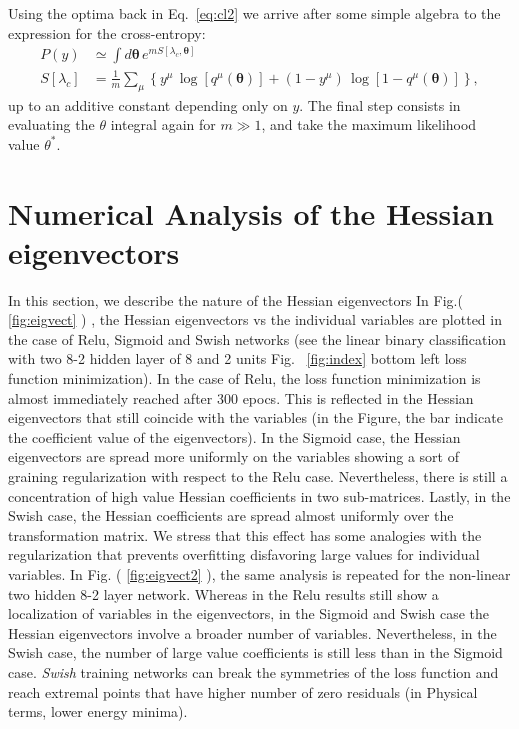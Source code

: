 \documentclass{article}
\begin{document}
%
Using the optima back in Eq.~\eqref{eq:cl2} we arrive after some simple algebra to the expression for the cross-entropy:
%
\begin{align} \label{eq:cl3}
P(y) &\simeq \int d\boldsymbol{\theta} \, e^{m S[\lambda_c, \boldsymbol{\theta}]} \\ \nonumber
S[\lambda_c] &= \frac{1}{m} \sum_{\mu} \left\{ y^{\mu} \, \log [ q^{\mu}( \boldsymbol{\theta} ) ] + (1-y^{\mu}) \, \log [1-q^{\mu}( \boldsymbol{\theta}) ] \right\},
\end{align}
%
up to an additive constant depending only on $y$. The final step consists in evaluating the $\theta$ integral again for $m \gg 1$, and take the maximum likelihood value $\theta^*$.

\section{Numerical Analysis of the Hessian eigenvectors}
In this section, we describe the nature of the Hessian eigenvectors
In Fig.( \ref{fig:eigvect} ) , the Hessian eigenvectors vs the individual variables are plotted in the case of Relu, Sigmoid and Swish networks (see the linear binary classification with two 8-2 hidden layer of 8 and 2 units Fig. ~\eqref{fig:index} bottom left loss function minimization). In the case of Relu, the loss function minimization is almost immediately reached after 300 epocs. This is reflected in the Hessian eigenvectors that still coincide with the variables (in the Figure, the bar indicate the coefficient value of the eigenvectors). In the Sigmoid case, the Hessian eigenvectors are spread more uniformly on the variables showing a sort of graining regularization with respect to the Relu case. Nevertheless, there is still a concentration of high value Hessian coefficients in two sub-matrices. Lastly, in the Swish case, the Hessian coefficients are spread almost uniformly over the transformation matrix. We stress that this effect has some analogies with the regularization that prevents overfitting disfavoring large values for individual variables.
In Fig. ( \ref{fig:eigvect2} ), the same analysis is repeated for the non-linear two hidden 8-2 layer network. Whereas in the Relu results still show a localization of variables in the eigenvectors, in the Sigmoid and Swish case the Hessian eigenvectors involve a broader number of variables. Nevertheless, in the Swish case, the number of large value coefficients is still less than in the Sigmoid case.
{\it Swish} training networks can break the symmetries of the loss function and reach extremal points that have higher number of zero residuals (in Physical terms, lower energy minima).
\end{document}
